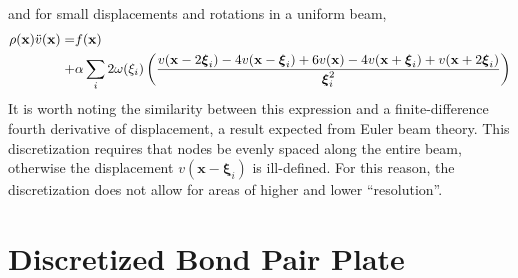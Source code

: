 and for small displacements and rotations in a uniform beam,
\begin{align}
\rho(\mathbf{x})\ddot{v}(\mathbf{x}) = &f(\mathbf{x})\notag \\
+&\alpha \sum_i 2\omega(\xi_i)\left(\frac{v(\mathbf{x}-2 \boldsymbol{\xi}_i)-4v(\mathbf{x}- \boldsymbol{\xi}_i)+6v(\mathbf{x})-4v(\mathbf{x}+ \boldsymbol{\xi}_i)+v(\mathbf{x}+2 \boldsymbol{\xi}_i)}{ \boldsymbol{\xi}_i^2}\right) \notag
\end{align}
It is worth noting the similarity between this expression and a finite-difference fourth derivative of displacement, a result expected from Euler beam theory.
This discretization requires that nodes be evenly spaced along the entire beam, otherwise the displacement \(v(\mathbf{x}- \boldsymbol{\xi}_i)\) is ill-defined. 
For this reason, the discretization does not allow for areas of higher and lower ``resolution''. 

\section{Discretized Bond Pair Plate}

